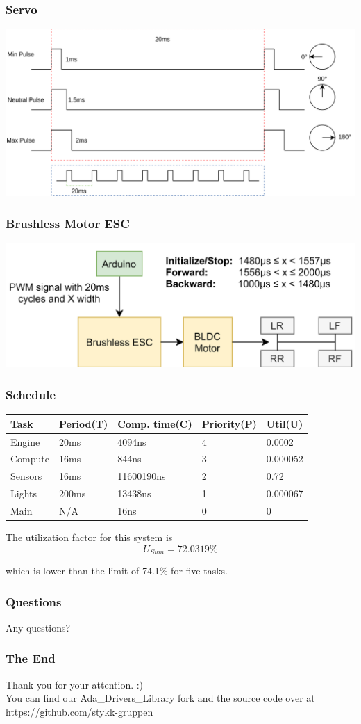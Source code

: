 \documentclass{beamer}
\begin{document}
\begin{frame}
    \frametitle{Servo}
    \includegraphics[width=\linewidth]{img/servo.png}
\end{frame}

\begin{frame}
    \frametitle{Brushless Motor ESC}
    \includegraphics[width=\linewidth]{img/brushless-motor-esc}
\end{frame}

\begin{frame}
    \frametitle{Schedule}
\begin{center}
 \begin{tabular}{||l l l l|l||}
 \hline
   Task & Period(T) & Comp. time(C) & Priority(P) & Util(U) \\ [0.5ex]
 \hline\hline
   Engine & 20ms & 4094ns & 4 & 0.0002 \\
 \hline
   Compute & 16ms & 844ns & 3 & 0.000052 \\
 \hline
   Sensors & 16ms & 11600190ns & 2 & 0.72 \\
 \hline
   Lights & 200ms & 13438ns & 1 & 0.000067 \\
 \hline
   Main & N/A & 16ns & 0 & 0 \\ [1ex]
 \hline
\end{tabular}
\end{center}

The utilization factor for this system is
\begin{equation*}
  U_{Sum} = 72.0319\%
\end{equation*}

which is lower than the limit of 74.1\% for five tasks.
\end{frame}

\begin{frame}
    \centering
    \frametitle{Questions}
Any questions?
\end{frame}

\begin{frame}
    \centering
    \frametitle{The End}
    Thank you for your attention. :)\\
    You can find our Ada\_Drivers\_Library fork and the source code over at https://github.com/stykk-gruppen
\end{frame}
\end{document}
